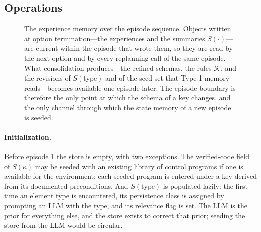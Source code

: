 \documentclass[11pt]{article}
\newcommand{\calK}{\mathcal{K}}
\newcommand{\type}{\mathrm{type}}
\begin{document}
\subsection{Operations}
\label{sec:type2-ops}
\begin{figure}[t]
\centering

\caption{The experience memory over the episode sequence. Objects written at option termination---the experiences and the summaries $S(\cdot)$---are current within the episode that wrote them, so they are read by the next option and by every replanning call of the same episode. What consolidation produces---the refined schemas, the rules $\calK$, and the revisions of $S(\type)$ and of the seed set that Type 1 memory reads---becomes available one episode later. The episode boundary is therefore the only point at which the schema of a key changes, and the only channel through which the state memory of a new episode is seeded.}
\label{fig:lifecycle}
\end{figure}

\paragraph{Initialization.}
Before episode 1 the store is empty, with two exceptions. The verified-code field of $S(\kappa)$ may be seeded with an existing library of control programs if one is available for the environment; each seeded program is entered under a key derived from its documented preconditions. And $S(\type)$ is populated lazily: the first time an element type is encountered, its persistence class is assigned by prompting an LLM with the type, and its relevance flag is set. The LLM is the prior for everything else, and the store exists to correct that prior; seeding the store from the LLM would be circular.
\end{document}
